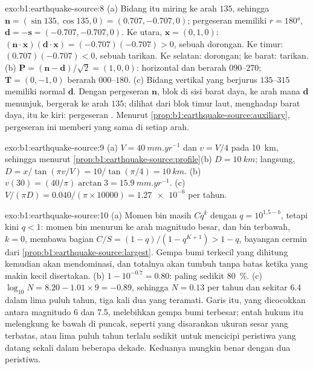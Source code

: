 \begin{solution}{exo:b1:earthquake-source:8}
(a) Bidang itu miring ke arah $135$, sehingga $\mathbf n = (\sin135, \cos135, 0) =
(0.707, -0.707, 0)$; pergeseran  memiliki $r = \ang{180}$, $\mathbf d = -\mathbf s
= (-0.707, -0.707, 0)$. Ke utara, $\mathbf x = (0, 1, 0)$:
$(\mathbf n\cdot\mathbf x)(\mathbf d\cdot\mathbf x) = (-0.707)(-0.707) > 0$, sebuah
dorongan. Ke timur: $(0.707)(-0.707) < 0$, sebuah tarikan. Ke selatan: dorongan; ke barat: tarikan.
(b) $\mathbf P = (\mathbf n - \mathbf d)/\sqrt2 = (1, 0, 0)$:  horizontal dan berarah $090$--$270$; $\mathbf T = (0, -1, 0)$ berarah
$000$--$180$. (c) Bidang vertikal yang berjurus $135$--$315$ memiliki normal
$\mathbf d$. Dengan pergeseran $\mathbf n$, blok di sisi barat daya, ke arah mana $\mathbf d$ menunjuk,
bergerak ke arah $135$; dilihat dari blok timur laut, menghadap barat daya, itu ke kiri:
pergeseran . Menurut
\cref{prop:b1:earthquake-source:auxiliary}, pergeseran ini memberi  yang sama di setiap arah.
\end{solution}

\begin{solution}{exo:b1:earthquake-source:9}
(a) $V = \qty{40}{mm.yr^{-1}}$ dan $v = V/4$ pada \qty{10}{km}, sehingga menurut
\cref{prop:b1:earthquake-source:profile}(b) $D = \qty{10}{km}$; langsung,
$D = x/\tan(\pi v/V) = 10/\tan(\pi/4) = \qty{10}{km}$. (b) $v(30) =
(40/\pi)\arctan 3 = \qty{15.9}{mm.yr^{-1}}$. (c) $V/(\pi D) =
\num{0.040}/(\pi\times\num{10000}) = \num{1.27e-6}$ per tahun.
\end{solution}

\begin{solution}{exo:b1:earthquake-source:10}
(a) Momen bin masih $C q^k$ dengan $q = 10^{1.5 - b}$, tetapi kini $q < 1$: momen bin menurun ke arah magnitudo besar, dan bin terbawah, $k = 0$, membawa bagian $C/S = (1 - q)/(1 - q^{K+1}) > 1 - q$, bayangan cermin dari \cref{prop:b1:earthquake-source:largest}. Gempa bumi terkecil yang dihitung kemudian akan mendominasi, dan totalnya akan tumbuh tanpa batas ketika yang makin kecil disertakan.
(b) $1 - 10^{-0.7} = 0.80$: paling sedikit \qty{80}{\percent}.
(c) $\log_{10}N = 8.20 - 1.01\times9 = -0.89$, sehingga $N = 0.13$ per tahun dan sekitar 6.4 dalam lima puluh tahun, tiga kali dua yang teramati. Garis itu, yang dicocokkan antara magnitudo 6 dan 7.5, melebihkan gempa bumi terbesar; entah hukum itu melengkung ke bawah di puncak, seperti yang disarankan ukuran sesar yang terbatas, atau lima puluh tahun terlalu sedikit untuk mencicipi peristiwa yang datang sekali dalam beberapa dekade. Keduanya mungkin benar dengan dua peristiwa.
\end{solution}

